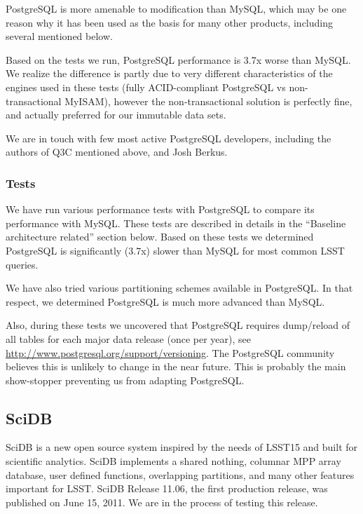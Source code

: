 \documentclass[DM,lsstdraft,toc]{lsstdoc}
\begin{document}
PostgreSQL is more amenable to modification than MySQL, which may be one
reason why it has been used as the basis for many other products,
including several mentioned below.

Based on the tests we run, PostgreSQL performance is 3.7x worse than
MySQL. We realize the difference is partly due to very different
characteristics of the engines used in these tests (fully ACID-compliant
PostgreSQL vs non-transactional MyISAM), however the non-transactional
solution is perfectly fine, and actually preferred for our immutable
data sets.

We are in touch with few most active PostgreSQL developers, including
the authors of Q3C mentioned above, and Josh Berkus.

\subsubsection{Tests}\label{tests}

We have run various performance tests with PostgreSQL to compare its
performance with MySQL. These tests are described in details in the
``Baseline architecture related'' section below. Based on these tests we
determined PostgreSQL is significantly (3.7x) slower than MySQL for most
common LSST queries.

We have also tried various partitioning schemes available in PostgreSQL.
In that respect, we determined PostgreSQL is much more advanced than
MySQL.

Also, during these tests we uncovered that PostgreSQL requires
dump/reload of all tables for each major data release (once per year),
see \url{http://www.postgresql.org/support/versioning}. The PostgreSQL
community believes this is unlikely to change in the near future. This
is probably the main show-stopper preventing us from adapting
PostgreSQL.

\subsection{SciDB}\label{scidb}

SciDB is a new open source system inspired by the needs of LSST15 and
built for scientific analytics. SciDB implements a shared nothing,
columnar MPP array database, user defined functions, overlapping
partitions, and many other features important for LSST. SciDB Release
11.06, the first production release, was published on June 15, 2011. We
are in the process of testing this release.
\end{document}

